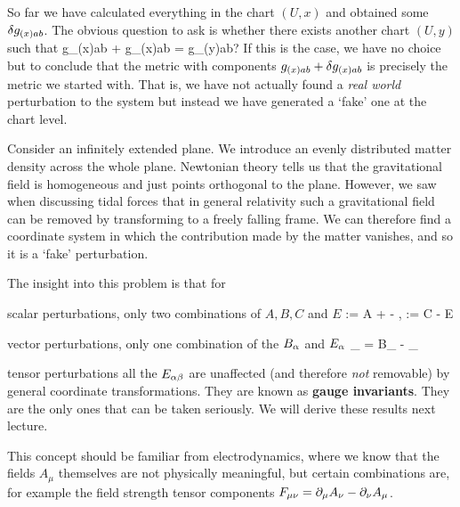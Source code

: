 So far we have calculated everything in the chart $(U,x)$ and obtained some $\delta g_{(x)ab}$. The obvious question to ask is whether there exists another chart $(U,y)$ such that 
\bse 
    g_{(x)ab} + \del g_{(x)ab} = g_{(y)ab}?
\ese 
If this is the case, we have no choice but to conclude that the metric with components $g_{(x)ab}+\delta g_{(x)ab}$ is precisely the metric we started with. That is, we have not actually found a \textit{real world} perturbation to the system but instead we have generated a `fake' one at the chart level. 

\bex 
    Consider an infinitely extended plane. We introduce an evenly distributed matter density across the whole plane. Newtonian theory tells us that the gravitational field is homogeneous and just points orthogonal to the plane. However, we saw when discussing tidal forces that in general relativity such a gravitational field can be removed by transforming to a freely falling frame. We can therefore find a coordinate system in which the contribution made by the matter vanishes, and so it is a `fake' perturbation. 
\eex 

The insight into this problem is that for
\benr 
    \item scalar perturbations, only two combinations of $A,B,C$ and $E$
    \bse 
        \Psi := A +  - , \qand \Phi := C - \Delta E
    \ese 
    \item vector perturbations, only one combination of the $B_{\alpha}$ and $E_{\alpha}$ 
    \bse 
        \Theta_{\a} = B_{\a} - _{\a}
    \ese 
    \item tensor perturbations all the $E_{\alpha\beta}$
\een 
are unaffected (and therefore \textit{not} removable) by general coordinate transformations. They are known as \textbf{gauge invariants}. They are the only ones that can be taken seriously. We will derive these results next lecture. 

This concept should be familiar from electrodynamics, where we know that the fields $A_{\mu}$ themselves are not physically meaningful, but certain combinations are, for example the field strength tensor components $F_{\mu\nu} = \partial_{\mu}A_{\nu}-\partial_{\nu}A_{\mu}$.